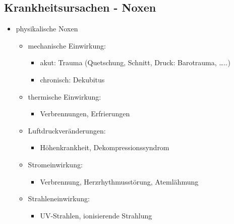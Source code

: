 \begin{it>emize}
\subsection{Krankheitsursachen - Noxen}
	\begin{itemize}
		\item physikalische Noxen
			\begin{itemize}
				\item mechanische Einwirkung:
					\begin{itemize}
						\item akut: Trauma (Quetschung, Schnitt, Druck: Barotrauma, …..)
						\item chronisch: Dekubitus
					\end{itemize}
				\item thermische Einwirkung:
					\begin{itemize}
						\item Verbrennungen, Erfrierungen
					\end{itemize}
				\item Luftdruckveränderungen:
					\begin{itemize}
						\item Höhenkrankheit, Dekompressionssyndrom
					\end{itemize}
				\item Stromeinwirkung:
					\begin{itemize}
						\item Verbrennung, Herzrhythmusstörung, Atemlähmung
					\end{itemize}
				\item Strahleneinwirkung:
					\begin{itemize}
						\item UV-Strahlen, ionisierende Strahlung
					\end{itemize}
			\end{itemize}
	\end{itemize}


\end{it>emize}
